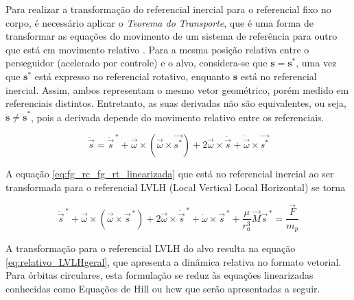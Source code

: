 Para realizar a transformação do referencial inercial para o referencial fixo no corpo, é necessário aplicar o \emph{Teorema do Transporte}, que é uma forma de transformar as equações do movimento de um sistema de referência para outro que está em movimento relativo \cite{wie2008space, symon1979}.
Para a mesma posição relativa entre o perseguidor (acelerado por controle) e o alvo, considera-se que
$\mathbf{s} = \mathbf{s}^*$,
uma vez que
$\mathbf{s}^*$
está expresso no referencial rotativo, enquanto $\mathbf{s}$ está no referencial inercial.
Assim, ambos representam o mesmo vetor geométrico, porém medido em referenciais distintos. Entretanto, as suas derivadas não são equivalentes, ou seja, $\dot{\mathbf{s}} \neq \dot{\mathbf{s}}^*$, pois a derivada depende do movimento relativo entre os referenciais.

\begin{equation}
\label{eq:TransporteSymon1979}
\ddot{\vec s} = 
\ddot{\vec s}^{\,*}
+\vec{\omega} \times (\vec \omega \times \vec {s^*})
+2 \vec{\omega} \times \dot{ \vec{s}}
+ \dot{\vec{\omega}} \times \vec{s^*}
\end{equation}

A equação \eqref{eq:fg_rc_fg_rt_linearizada} que está no referencial inercial ao ser transformada para o referencial LVLH (Local Vertical Local Horizontal) se torna \cite{fehse2003}

\begin{equation}
\label{eq:relativo_LVLHgeral}
\ddot{\vec s}^{\,*}
+ \vec \omega \times (\vec \omega \times \vec{s}^{\,*})
+ 2 \vec \omega \times \dot{\vec s}^{\,*} 
+ \dot{\omega} \times \vec{s}^{\,*}
+ \frac{\mu}{r^3_a} \vec{M} \vec{s}^{\,*}
= \frac{\vec{F}}{m_p}
\end{equation}

A transformação para o referencial LVLH do alvo resulta na equação \eqref{eq:relativo_LVLHgeral}, que apresenta a dinâmica relativa no formato vetorial.
Para órbitas circulares, esta formulação se reduz às equações linearizadas conhecidas como Equações de Hill ou \gls{hcw} que serão apresentadas a seguir.




